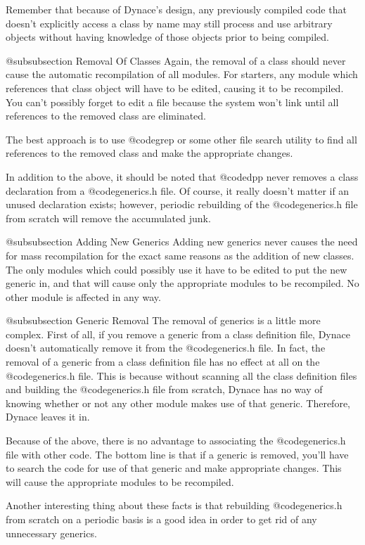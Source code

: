 Remember that because of Dynace's design, any previously compiled code
that doesn't explicitly access a class by name may still process
and use arbitrary objects without having knowledge of those objects
prior to being compiled.

@subsubsection Removal Of Classes
Again, the removal of a class should never cause the automatic
recompilation of all modules.  For starters, any module which
references that class object will have to be edited, causing it to
be recompiled.  You can't possibly forget to edit a file because
the system won't link until all references to the removed class
are eliminated.

The best approach is to use @code{grep} or some other file search utility
to find all references to the removed class and make the appropriate
changes.

In addition to the above, it should be noted that @code{dpp} never
removes a class declaration from a @code{generics.h} file.  Of
course, it really doesn't matter if an unused declaration exists;
however, periodic rebuilding of the @code{generics.h} file
from scratch will remove the accumulated junk.

@subsubsection Adding New Generics
Adding new generics never causes the need for mass recompilation for the
exact same reasons as the addition of new classes.  The only modules
which could possibly use it have to be edited to put the new generic in,
and that will cause only the appropriate modules to be recompiled.
No other module is affected in any way.

@subsubsection Generic Removal
The removal of generics is a little more complex.  First of all,
if you remove a generic from a class definition file, Dynace
doesn't automatically remove it from the @code{generics.h} file.
In fact, the removal of a generic from a class definition file
has no effect at all on the @code{generics.h} file.  This is because
without scanning all the class definition files and building the
@code{generics.h} file from scratch, Dynace has no way of knowing
whether or not any other module makes use of that generic.
Therefore, Dynace leaves it in.

Because of the above, there is no advantage to associating the
@code{generics.h} file with other code.  The bottom line is that
if a generic is removed, you'll have to search the code for
use of that generic and make appropriate changes.  This will
cause the appropriate modules to be recompiled.

Another interesting thing about these facts is that rebuilding
@code{generics.h} from scratch on a periodic basis is a good idea in
order to get rid of any unnecessary generics.

